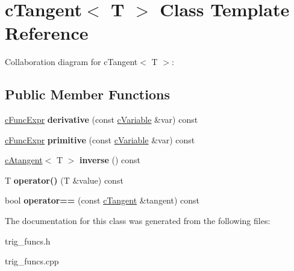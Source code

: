 \hypertarget{classcTangent}{\section{c\-Tangent$<$ T $>$ Class Template Reference}
\label{classcTangent}
}


Collaboration diagram for c\-Tangent$<$ T $>$\-:
\subsection*{Public Member Functions}
\begin{DoxyCompactItemize}
\item 
\hypertarget{classcTangent_a6b936ca1fd5997d302b9a7e834a95a13}{\hyperlink{classcFuncExpr}{c\-Func\-Expr} {\bfseries derivative} (const \hyperlink{classcVariable}{c\-Variable} \&var) const }\label{classcTangent_a6b936ca1fd5997d302b9a7e834a95a13}

\item 
\hypertarget{classcTangent_a453f793fa28d9c9acabe91b002394bb3}{\hyperlink{classcFuncExpr}{c\-Func\-Expr} {\bfseries primitive} (const \hyperlink{classcVariable}{c\-Variable} \&var) const }\label{classcTangent_a453f793fa28d9c9acabe91b002394bb3}

\item 
\hypertarget{classcTangent_aa9520813ab0ea5dbbe8b8e96d42ed7d6}{\hyperlink{classcAtangent}{c\-Atangent}$<$ T $>$ {\bfseries inverse} () const }\label{classcTangent_aa9520813ab0ea5dbbe8b8e96d42ed7d6}

\item 
\hypertarget{classcTangent_ae26afe6de6cfc82cd7c21a1a6c5180c7}{T {\bfseries operator()} (T \&value) const }\label{classcTangent_ae26afe6de6cfc82cd7c21a1a6c5180c7}

\item 
\hypertarget{classcTangent_aa387bb378af185bca7cd92b23f305ce0}{bool {\bfseries operator==} (const \hyperlink{classcTangent}{c\-Tangent} \&tangent) const }\label{classcTangent_aa387bb378af185bca7cd92b23f305ce0}

\end{DoxyCompactItemize}


The documentation for this class was generated from the following files\-:\begin{DoxyCompactItemize}
\item 
trig\-\_\-funcs.\-h\item 
trig\-\_\-funcs.\-cpp\end{DoxyCompactItemize}
